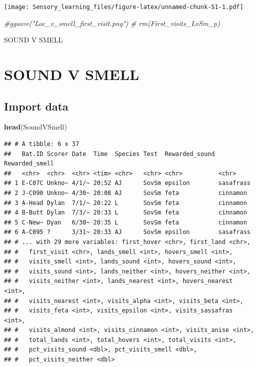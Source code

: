 \documentclass[]{article}
\newenvironment{Shaded}{\begin{snugshade}}{\end{snugshade}}
\newcommand{\KeywordTok}[1]{\textcolor[rgb]{0.13,0.29,0.53}{\textbf{{#1}}}}
\newcommand{\CommentTok}[1]{\textcolor[rgb]{0.56,0.35,0.01}{\textit{{#1}}}}
\newcommand{\NormalTok}[1]{{#1}}
\begin{document}
\texttt{[image: Sensory\_learning\_files/figure-latex/unnamed-chunk-51-1.pdf]}

\begin{Shaded}
\begin{Highlighting}[]
  \CommentTok{#ggsave("Loc_v_smell_first_visit.png")}
 \CommentTok{# rm(First_visits_LvSm_p)}
\end{Highlighting}
\end{Shaded}

SOUND V SMELL

\section{SOUND V SMELL}\label{sound-v-smell-1}

\subsection{Import data}\label{import-data-2}

\begin{Shaded}
\begin{Highlighting}[]
\KeywordTok{head}\NormalTok{(SoundVSmell)}
\end{Highlighting}
\end{Shaded}

\begin{verbatim}
## # A tibble: 6 x 37
##   Bat.ID Scorer Date  Time  Species Test  Rewarded_sound Rewarded_smell
##   <chr>  <chr>  <chr> <tim> <chr>   <chr> <chr>          <chr>         
## 1 E-C07C Unkno~ 4/1/~ 20:52 AJ      SovSm epsilon        sasafrass     
## 2 J-C090 Unkno~ 4/30~ 20:08 AJ      SovSm feta           cinnamon      
## 3 A-Head Dylan  7/1/~ 20:22 L       SovSm feta           cinnamon      
## 4 B-Butt Dylan  7/3/~ 20:33 L       SovSm feta           cinnamon      
## 5 C-New~ Dyan   6/30~ 20:35 L       SovSm feta           cinnamon      
## 6 A-C095 ?      3/31~ 20:33 AJ      SovSm epsilon        sasafrass     
## # ... with 29 more variables: first_hover <chr>, first_land <chr>,
## #   first_visit <chr>, lands_smell <int>, hovers_smell <int>,
## #   visits_smell <int>, lands_sound <int>, hovers_sound <int>,
## #   visits_sound <int>, lands_neither <int>, hovers_neither <int>,
## #   visits_neither <int>, lands_nearest <int>, hovers_nearest <int>,
## #   visits_nearest <int>, visits_alpha <int>, visits_beta <int>,
## #   visits_feta <int>, visits_epsilon <int>, visits_sassafras <int>,
## #   visits_almond <int>, visits_cinnamon <int>, visits_anise <int>,
## #   total_lands <int>, total_hovers <int>, total_visits <int>,
## #   pct_visits_sound <dbl>, pct_visits_smell <dbl>,
## #   pct_visits_neither <dbl>
\end{verbatim}
\end{document}
